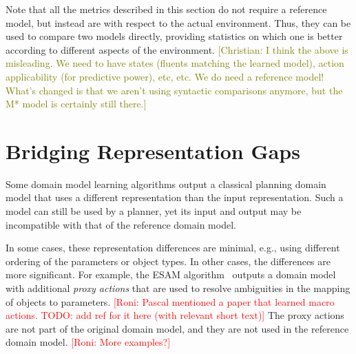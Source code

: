 \documentclass{article}
\theoremstyle{definition}
\theoremstyle{remark}
\newcommand{\roni}[1]{{\textcolor{red}{[Roni: #1]}}}
\newcommand{\cm}[1]{{\textcolor{olive}{[Christian: #1]}}}
\begin{document}
Note that all the metrics described in this section do not require a reference model, but instead are with respect to the actual environment. Thus, they can be used to compare two models directly,  providing statistics on which one is better according to different aspects of the environment.
\cm{I think the above is misleading. We need to have states (fluents matching the learned model), action applicability (for predictive power), etc, etc. We do need a reference model! What's changed is that we aren't using syntactic comparisons anymore, but the M* model is certainly still there.}







\section{Bridging Representation Gaps}
\label{sec:bridging-gap}
Some domain model learning algorithms output a classical planning domain model that uses a different representation than the input representation. Such a model can still be used by a planner, yet its input and output may be incompatible with that of the reference domain model. 

In some cases, these representation differences are minimal, e.g., using different ordering of the parameters or object types. 
In other cases, the differences are more significant. 
For example, the ESAM algorithm~\citep{juba2021safe} outputs a domain model with additional \emph{proxy actions} that are used to resolve ambiguities in the mapping of objects to parameters.
\roni{Pascal mentioned a paper that learned macro actions. TODO: add ref for it here (with relevant short text)}
The proxy actions are not part of the original domain model, and they are not used in the reference domain model. 
\roni{More examples?}
\end{document}
